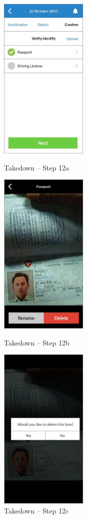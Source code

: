 \begin{figure}
  \subfigures
  \centering
  \begin{minipage}{4.6cm}
    \centering
    \includegraphics[width=4.2cm]{inc/ui_takedown_step12a.jpg}
    \caption{Takedown -- Step 12a}
    \label{fig:ui_takedown_step12a}
  \end{minipage}
  \begin{minipage}{4.6cm}
    \centering
    \includegraphics[width=4.2cm]{inc/ui_takedown_step12b.jpg}
    \caption{Takedown -- Step 12b}
    \label{fig:ui_takedown_step12b}
  \end{minipage}
  \begin{minipage}{4.6cm}
    \centering
    \includegraphics[width=4.2cm]{inc/ui_takedown_step12c.jpg}
    \caption{Takedown -- Step 12c}
    \label{fig:ui_takedown_step12c}
  \end{minipage}
\end{figure}

